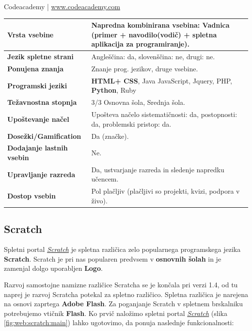 \begin{osebnabox}[label={osebna:codeacademy}]{Codeacademy | \url{www.codeacademy.com}}
    \begin{tabular}{
  p{} |
  p{}  }
  \textbf{Vrsta vsebine} & Napredna kombinirana vsebina: Vadnica
                           (primer +  navodilo(vodič) + spletna
                           aplikacija za programiranje).  \\
      \hline
  \textbf{Jezik spletne strani} &  Angleščina: da, slovenščina: ne,
                                  drugi: ne. \\
      \hline
  \textbf{Ponujena znanja} & Znanje prog. jezikov, druge vsebine. \\
      \hline
 \textbf{Programski jeziki} & \textbf{HTML+ CSS}, Java JavaScript, Jquery, PHP,
                              \textbf{Python}, Ruby \\
      \hline
  \textbf{Težavnostna stopnja} & 3/3 Osnovna šola, Srednja šola. \\
      \hline
   \textbf{Upoštevanje načel} & Upošteva načelo sistematičnosti: da,
      postopnosti: da, problemski pristop: da. \\
      \hline
  \textbf{Dosežki/Gamification} & Da (značke). \\
      \hline
  \textbf{Dodajanje lastnih vsebin} & Ne. \\
      \hline
  \textbf{Upravljanje razreda} &Da, ustvarjanje razreda in sledenje
                                 napredku učencem. \\
      \hline
  \textbf{Dostop vsebin} & Pol plačljiv (plačljivi so projekti, kvizi,
                           podpora v živo). \\
\end{tabular}
\end{osebnabox}

\subsection{Scratch}
\label{sec:scratch}

Spletni portal \emph{\href{https://scratch.mit.edu/}{Scratch}}
\cite{web:scratch} je spletna različica zelo popularnega programskega
jezika \textbf{Scratch}. Scratch je pri nas popularen predvsem v
\textbf{osnovnih šolah} in je zamenjal dolgo uporabljen \textbf{Logo}.

Razvoj samostojne namizne različice Scratcha se je končala pri verzi
1.4, od tu naprej je razvoj Scratcha potekal za spletno
različico. Spletna različica je narejena na osnovi zaprtega
\textbf{Adobe Flash}. Za poganjanje Scratch v spletnem brskalniku
potrebujemo vtičnik \textbf{Flash}. Ko prvič naložimo spletni portal
\emph{\href{https://scratch.mit.edu/}{Scratch}} (slika
\ref{fig:web:scratch:main}) lahko ugotovimo, da ponuja naslednje
funkcionalnosti:

